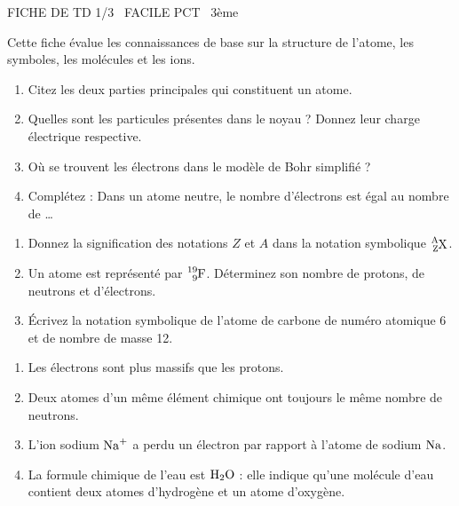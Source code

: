 \documentclass[11pt]{article}
\begin{document}
\begin{tcolorbox}[enhanced,colback=popink,colframe=popink,arc=10pt,boxrule=0pt,left=12pt,right=12pt,top=9pt,bottom=9pt]
{\color{white}\popxbold\small FICHE DE TD 1/3 \textbullet\ FACILE \hfill PCT \textbullet\ 3ème\par}
\end{tcolorbox}
\vspace{4pt}
Cette fiche évalue les connaissances de base sur la structure de l'atome, les symboles, les molécules et les ions.

\begin{exercice}
\begin{enumerate}
    \item Citez les deux parties principales qui constituent un atome.
    \item Quelles sont les particules présentes dans le noyau ? Donnez leur charge électrique respective.
    \item Où se trouvent les électrons dans le modèle de Bohr simplifié ?
    \item Complétez : Dans un atome neutre, le nombre d'électrons est égal au nombre de \ldots
\end{enumerate}
\end{exercice}

\begin{exercice}
\begin{enumerate}
    \item Donnez la signification des notations $Z$ et $A$ dans la notation symbolique $\ce{^{A}_{Z}X}$.
    \item Un atome est représenté par $\ce{^{19}_{9}F}$. Déterminez son nombre de protons, de neutrons et d'électrons.
    \item Écrivez la notation symbolique de l'atome de carbone de numéro atomique 6 et de nombre de masse 12.
\end{enumerate}
\end{exercice}

\begin{exercice}
\begin{enumerate}
    \item Les électrons sont plus massifs que les protons.
    \item Deux atomes d'un même élément chimique ont toujours le même nombre de neutrons.
    \item L'ion sodium $\ce{Na+}$ a perdu un électron par rapport à l'atome de sodium $\ce{Na}$.
    \item La formule chimique de l'eau est $\ce{H2O}$ : elle indique qu'une molécule d'eau contient deux atomes d'hydrogène et un atome d'oxygène.
\end{enumerate}
\end{exercice}
\end{document}
